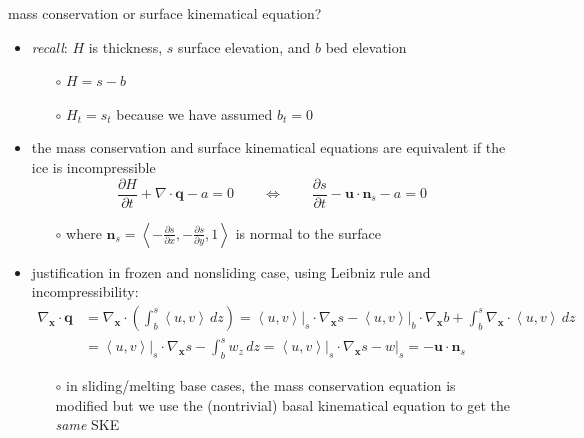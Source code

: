 \documentclass[10pt,hyperref,dvipsnames]{beamer}
\newcommand{\bn}{\mathbf{n}}
\newcommand{\bq}{\mathbf{q}}
\newcommand{\bx}{\mathbf{x}}
\newcommand{\bu}{\mathbf{u}}
\newcommand{\grad}{\nabla}
\newcommand{\Div}{\nabla\cdot}
\newcommand{\Divbx}{\nabla_{\bx}\cdot}
\begin{document}
\begin{frame}{mass conservation or surface kinematical equation?}
\begin{itemize}
\item \emph{recall}: $H$ is thickness, $s$ surface elevation, and $b$ bed elevation
    \begin{itemize}
    \item[$\circ$] $H=s-b$
    \item[$\circ$] $H_t=s_t$ because we have assumed $b_t=0$
    \end{itemize}
\item the mass conservation and surface kinematical equations are equivalent if the ice is incompressible
    $$\frac{\partial H}{\partial t} + \Div \bq - a = 0 \qquad \iff \qquad \frac{\partial s}{\partial t} - \bu \cdot \bn_s - a = 0$$
    \begin{itemize}
    \item[$\circ$] where $\bn_s = \left<-\frac{\partial s}{\partial x},-\frac{\partial s}{\partial y},1\right>$ is normal to the surface
    \end{itemize}

\bigskip
\scriptsize
\item justification in frozen and nonsliding case, using Leibniz rule and incompressibility:
\begin{align*}
\Divbx \bq &= \Divbx \left(\int_b^s \left<u,v\right>\,dz\right) = \left<u,v\right>\big|_s \cdot \grad_{\bx} s - \left<u,v\right>\big|_b \cdot \grad_{\bx} b + \int_b^s \Divbx \left<u,v\right>\,dz \\
           &= \left<u,v\right>\big|_s \cdot \grad_{\bx} s - \int_b^s w_z\,dz = \left<u,v\right>\big|_s \cdot \grad_{\bx} s - w\big|_s = - \bu \cdot \bn_s
\end{align*}

    \vspace{-2mm}
    \begin{itemize}
    \scriptsize
    \item[$\circ$] in sliding/melting base cases, the mass conservation equation is modified but we use the (nontrivial) basal kinematical equation to get the \emph{same} SKE
    \end{itemize}
\end{itemize}
\end{frame}
\end{document}
